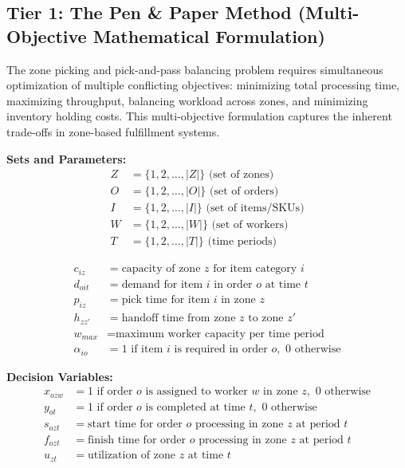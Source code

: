 \documentclass{article}
\begin{document}
\subsection{Tier 1: The Pen \& Paper Method (Multi-Objective Mathematical Formulation)}

The zone picking and pick-and-pass balancing problem requires simultaneous optimization of multiple conflicting objectives: minimizing total processing time, maximizing throughput, balancing workload across zones, and minimizing inventory holding costs. This multi-objective formulation captures the inherent trade-offs in zone-based fulfillment systems.

\textbf{Sets and Parameters:}
\begin{align}
Z &= \{1, 2, \ldots, |Z|\} \text{ (set of zones)} \\
O &= \{1, 2, \ldots, |O|\} \text{ (set of orders)} \\
I &= \{1, 2, \ldots, |I|\} \text{ (set of items/SKUs)} \\
W &= \{1, 2, \ldots, |W|\} \text{ (set of workers)} \\
T &= \{1, 2, \ldots, |T|\} \text{ (time periods)}
\end{align}

\begin{align}
c_{iz} &= \text{capacity of zone } z \text{ for item category } i \\
d_{oit} &= \text{demand for item } i \text{ in order } o \text{ at time } t \\
p_{iz} &= \text{pick time for item } i \text{ in zone } z \\
h_{zz'} &= \text{handoff time from zone } z \text{ to zone } z' \\
w_{max} &= \text{maximum worker capacity per time period} \\
\alpha_{io} &= 1 \text{ if item } i \text{ is required in order } o, \text{ 0 otherwise}
\end{align}

\textbf{Decision Variables:}
\begin{align}
x_{ozw} &= 1 \text{ if order } o \text{ is assigned to worker } w \text{ in zone } z, \text{ 0 otherwise} \\
y_{ot} &= 1 \text{ if order } o \text{ is completed at time } t, \text{ 0 otherwise} \\
s_{ozt} &= \text{start time for order } o \text{ processing in zone } z \text{ at period } t \\
f_{ozt} &= \text{finish time for order } o \text{ processing in zone } z \text{ at period } t \\
u_{zt} &= \text{utilization of zone } z \text{ at time } t
\end{align}
\end{document}
